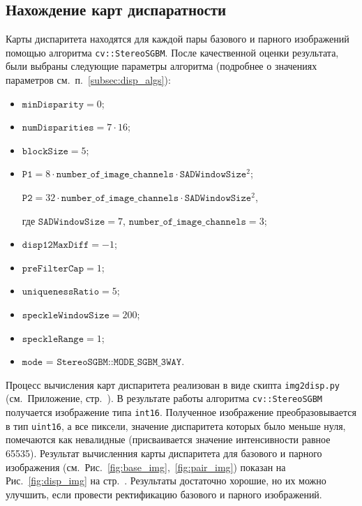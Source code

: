 \documentclass[oneside,final,12pt]{scrartcl}
\begin{document}
		\subsection{Нахождение карт диспаратности}
			Карты диспаритета находятся для каждой пары базового и парного изображений помощью алгоритма \texttt{cv::StereoSGBM}. После качественной оценки результата, были выбраны следующие параметры алгоритма (подробнее о значениях параметров см.~п.~\ref{subsec:disp_algs}):
			\begin{itemize}
				\item \(\texttt{minDisparity} = 0\);

				\item \(\texttt{numDisparities} = 7 \cdot 16\);

				\item \(\texttt{blockSize} = 5\);


				\item \(\texttt{P1} =8 \cdot \texttt{number\_of\_image\_channels} \cdot \texttt{SADWindowSize}^{2}\);

				\(\texttt{P2} =32  \cdot \texttt{number\_of\_image\_channels} \cdot \texttt{SADWindowSize}^{2}\),

				где \(\texttt{SADWindowSize} = 7\),		\(\texttt{number\_of\_image\_channels} = 3\);

				\item \(\texttt{disp12MaxDiff} = -1\);

				\item \(\texttt{preFilterCap}  = 1\);

				\item \(\texttt{uniquenessRatio}  = 5\);

				\item \(\texttt{speckleWindowSize} = 200\);

				\item \(\texttt{speckleRange} = 1\);

				\item \(\texttt{mode = StereoSGBM::MODE\_SGBM\_3WAY}\).
			\end{itemize}

			Процесс вычисления карт диспаритета реализован в виде скипта \texttt{img2disp.py} (см.~Приложение, стр.~\pageref{app:imgs2disp}). В результате работы алгоритма \texttt{cv::StereoSGBM} получается изображение типа \texttt{int16}. Полученное изображение преобразовывается в тип \texttt{uint16}, а все пиксели, значение диспаритета которых было меньше нуля, помечаются как невалидные (присваивается значение интенсивности равное 65535). Результат вычисленния карты диспаритета для базового и парного изображения (см.~Рис.~\ref{fig:base_img},~\ref{fig:pair_img}) показан на Рис.~\ref{fig:disp_img} на стр.~\pageref{fig:disp_img}. Результаты достаточно хорошие, но их можно улучшить, если провести ректификацию базового и парного изображений.%
\end{document}
